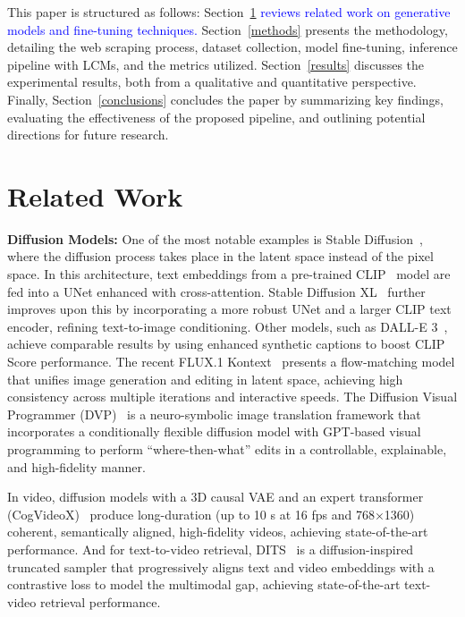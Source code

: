 \documentclass[pdflatex,sn-mathphys-num]{sn-jnl}%
\theoremstyle{thmstyleone}%
\theoremstyle{thmstyletwo}%
\theoremstyle{thmstylethree}%
\begin{document}
This paper is structured as follows: Section~\ref{related_work} \textcolor{blue}{reviews related work on generative models and fine-tuning techniques.} Section~\ref{methods} presents the methodology, detailing the web scraping process, dataset collection, model fine-tuning, inference pipeline with LCMs, and the metrics utilized. Section~\ref{results} discusses the experimental results, both from a qualitative and quantitative perspective. Finally, Section~\ref{conclusions} concludes the paper by summarizing key findings, evaluating the effectiveness of the proposed pipeline, and outlining potential directions for future research. 

\section{Related Work}
\label{related_work}

\textbf{Diffusion Models:} One of the most notable examples is Stable Diffusion~\cite{rombach2022high}, where the diffusion process takes place in the latent space instead of the pixel space. In this architecture, text embeddings from a pre-trained CLIP~\cite{clip} model are fed into a UNet enhanced with cross-attention. Stable Diffusion XL~\cite{sdxl} further improves upon this by incorporating a more robust UNet and a larger CLIP text encoder, refining text-to-image conditioning. Other models, such as DALL-E 3~\cite{betker2023improving}, achieve comparable results by using enhanced synthetic captions to boost CLIP Score performance. The recent FLUX.1 Kontext~\cite{labs2025flux1kontextflowmatching} presents a flow‐matching model that unifies image generation and editing in latent space, achieving high consistency across multiple iterations and interactive speeds. The Diffusion Visual Programmer (DVP)~\cite{han2024imagetranslationdiffusionvisual} is a neuro-symbolic image translation framework that incorporates a conditionally flexible diffusion model with GPT-based visual programming to perform “where-then-what” edits in a controllable, explainable, and high-fidelity manner.

In video, diffusion models with a 3D causal VAE and an expert transformer (CogVideoX)~\cite{yang2025cogvideoxtexttovideodiffusionmodels} produce long-duration (up to 10 s at 16 fps and 768×1360) coherent, semantically aligned, high-fidelity videos, achieving state-of-the-art performance. And for text-to-video retrieval, DITS~\cite{NEURIPS2024_0731f0e6} is a diffusion-inspired truncated sampler that progressively aligns text and video embeddings with a contrastive loss to model the multimodal gap, achieving state-of-the-art text-video retrieval performance.
\end{document}

